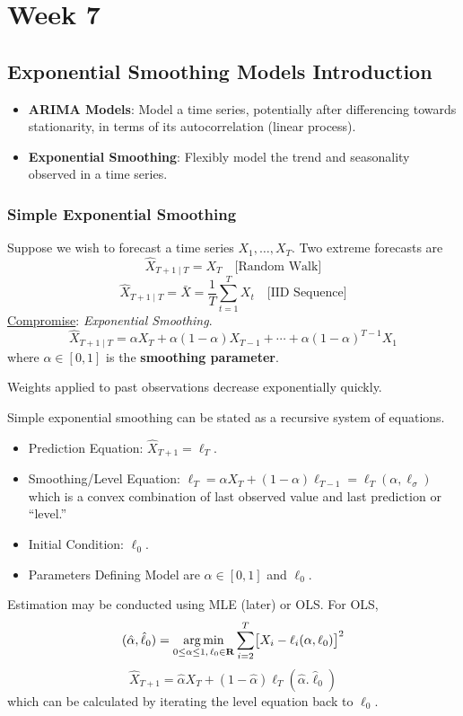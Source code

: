 \chapter{Week 7}
\section{Exponential Smoothing Models Introduction}
\begin{itemize}
    \item \textbf{ARIMA Models}: Model a time series, potentially after differencing towards
          stationarity, in terms of its autocorrelation (linear process).
    \item \textbf{Exponential Smoothing}: Flexibly model the trend and seasonality
          observed in a time series.
\end{itemize}
\subsection*{Simple Exponential Smoothing}
Suppose we wish to forecast a time series $ X_1,\ldots,X_T $. Two extreme
forecasts are
\[ \hat{X}_{T+1\mid T}=X_T\quad\text{[Random Walk]} \]
\[ \hat{X}_{T+1\mid T}=\bar{X}=\frac{1}{T} \sum_{t=1}^{T} X_t \quad\text{[IID Sequence]} \]
\underline{Compromise}: \emph{Exponential Smoothing}.
\[ \hat{X}_{T+1\mid T}=\alpha X_T+\alpha(1-\alpha)X_{T-1}+\cdots+\alpha(1-\alpha)^{T-1}X_1 \]
where $ \alpha\in[0,1] $ is the \textbf{smoothing parameter}.

Weights applied to past observations decrease exponentially quickly.

Simple exponential smoothing can be stated as a recursive system of equations.
\begin{itemize}
    \item Prediction Equation: $ \hat{X}_{T+1}=\ell_T $.
    \item Smoothing/Level Equation: $ \ell_T=\alpha X_T+(1-\alpha)\ell_{T-1}=\ell_T(\alpha,\ell_\sigma) $
          which is a convex combination of last observed value and last prediction or ``level.''
    \item Initial Condition: $ \ell_0 $.
    \item Parameters Defining Model are $ \alpha\in[0,1] $ and $ \ell_0 $.
\end{itemize}
Estimation may be conducted using MLE (later) or OLS\@. For OLS,
\[ (\hat{\alpha},\hat{\ell}_0)=\operatorname*{arg\,min}_{0\le \alpha\le 1,\,\ell_0\in\mathbf{R}}
    \sum_{i=2}^{T} \bigl[X_i-\ell_i(\alpha,\ell_0)\bigr]^2 \]
\[ \hat{X}_{T+1}=\hat{\alpha}X_T+(1-\hat{\alpha})\ell_T(\hat{\alpha}.\hat{\ell}_0) \]
which can be calculated by iterating the level equation back to $ \ell_0 $.

